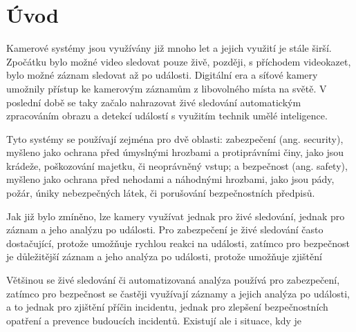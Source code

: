 \chapter{Úvod}
\label{sec:Introduction}

Kamerové systémy jsou využívány již mnoho let a jejich využití je stále širší.
Zpočátku bylo možné video sledovat pouze živě, později, s příchodem videokazet,
bylo možné záznam sledovat až po události. Digitální era a síťové kamery
umožnily přístup ke kamerovým záznamům z libovolného místa na světě. V poslední
době se taky začalo nahrazovat živé sledování automatickým zpracováním obrazu a
detekcí událostí s využitím technik umělé inteligence.

Tyto systémy se používají zejména pro dvě oblasti: zabezpečení (ang. security),
myšleno jako ochrana před úmyslnými hrozbami a protiprávními činy, jako jsou
krádeže, poškozování majetku, či neoprávněný vstup; a bezpečnost (ang. safety),
myšleno jako ochrana před nehodami a náhodnými hrozbami, jako jsou pády, požár,
úniky nebezpečných látek, či porušování bezpečnostních předpisů.

Jak již bylo zmíněno, lze kamery využívat jednak pro živé sledování, jednak pro
záznam a jeho analýzu po události. Pro zabezpečení je živé sledování často
dostačující, protože umožňuje rychlou reakci na události, zatímco pro bezpečnost
je důležitější záznam a jeho analýza po události, protože umožňuje zjištění


Většinou se živé sledování či automatizovaná analýza používá pro zabezpečení,
zatímco pro bezpečnost se častěji využívají záznamy a jejich analýza po
události, a to jednak pro zjištění příčin incidentu, jednak pro zlepšení
bezpečnostních opatření a prevence budoucích incidentů. Existují ale i situace, kdy je 

\endinput